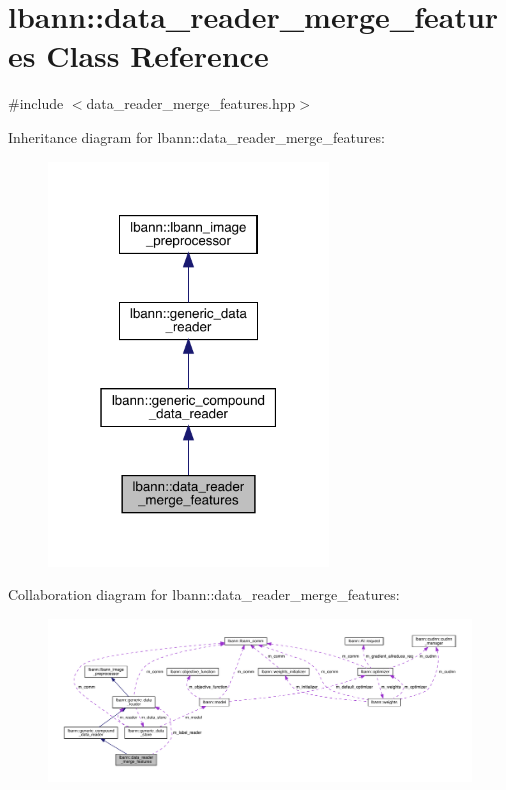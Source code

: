 \hypertarget{classlbann_1_1data__reader__merge__features}{}\section{lbann\+:\+:data\+\_\+reader\+\_\+merge\+\_\+features Class Reference}
\label{classlbann_1_1data__reader__merge__features}


{\ttfamily \#include $<$data\+\_\+reader\+\_\+merge\+\_\+features.\+hpp$>$}



Inheritance diagram for lbann\+:\+:data\+\_\+reader\+\_\+merge\+\_\+features\+:\nopagebreak
\begin{figure}[H]
\begin{center}
\leavevmode
\includegraphics[width=211pt]{classlbann_1_1data__reader__merge__features__inherit__graph}
\end{center}
\end{figure}


Collaboration diagram for lbann\+:\+:data\+\_\+reader\+\_\+merge\+\_\+features\+:\nopagebreak
\begin{figure}[H]
\begin{center}
\leavevmode
\includegraphics[width=350pt]{classlbann_1_1data__reader__merge__features__coll__graph}
\end{center}
\end{figure}

